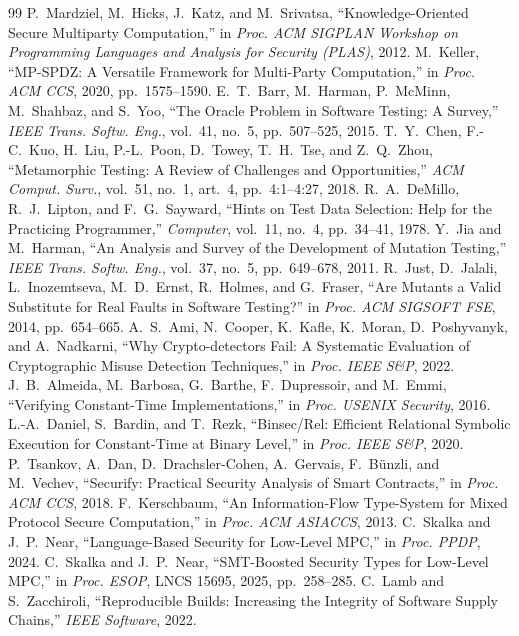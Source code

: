 \documentclass[conference]{IEEEtran}
\begin{document}
\begin{thebibliography}{99}\footnotesize
{} P.~Mardziel, M.~Hicks, J.~Katz, and M.~Srivatsa, ``Knowledge-Oriented Secure Multiparty Computation,'' in \emph{Proc. ACM SIGPLAN Workshop on Programming Languages and Analysis for Security (PLAS)}, 2012.
 M.~Keller, ``MP-SPDZ: A Versatile Framework for Multi-Party Computation,'' in \emph{Proc. ACM CCS}, 2020, pp.~1575--1590.
 E.~T.~Barr, M.~Harman, P.~McMinn, M.~Shahbaz, and S.~Yoo, ``The Oracle Problem in Software Testing: A Survey,'' \emph{IEEE Trans. Softw. Eng.}, vol.~41, no.~5, pp.~507--525, 2015.
 T.~Y.~Chen, F.-C.~Kuo, H.~Liu, P.-L.~Poon, D.~Towey, T.~H.~Tse, and Z.~Q.~Zhou, ``Metamorphic Testing: A Review of Challenges and Opportunities,'' \emph{ACM Comput. Surv.}, vol.~51, no.~1, art.~4, pp.~4:1--4:27, 2018.
 R.~A.~DeMillo, R.~J.~Lipton, and F.~G.~Sayward, ``Hints on Test Data Selection: Help for the Practicing Programmer,'' \emph{Computer}, vol.~11, no.~4, pp.~34--41, 1978.
 Y.~Jia and M.~Harman, ``An Analysis and Survey of the Development of Mutation Testing,'' \emph{IEEE Trans. Softw. Eng.}, vol.~37, no.~5, pp.~649--678, 2011.
 R.~Just, D.~Jalali, L.~Inozemtseva, M.~D.~Ernst, R.~Holmes, and G.~Fraser, ``Are Mutants a Valid Substitute for Real Faults in Software Testing?'' in \emph{Proc. ACM SIGSOFT FSE}, 2014, pp.~654--665.
 A.~S.~Ami, N.~Cooper, K.~Kafle, K.~Moran, D.~Poshyvanyk, and A.~Nadkarni, ``Why Crypto-detectors Fail: A Systematic Evaluation of Cryptographic Misuse Detection Techniques,'' in \emph{Proc. IEEE S\&P}, 2022.
 J.~B.~Almeida, M.~Barbosa, G.~Barthe, F.~Dupressoir, and M.~Emmi, ``Verifying Constant-Time Implementations,'' in \emph{Proc. USENIX Security}, 2016.
 L.-A.~Daniel, S.~Bardin, and T.~Rezk, ``Binsec/Rel: Efficient Relational Symbolic Execution for Constant-Time at Binary Level,'' in \emph{Proc. IEEE S\&P}, 2020.
 P.~Tsankov, A.~Dan, D.~Drachsler-Cohen, A.~Gervais, F.~B\"unzli, and M.~Vechev, ``Securify: Practical Security Analysis of Smart Contracts,'' in \emph{Proc. ACM CCS}, 2018.
 F.~Kerschbaum, ``An Information-Flow Type-System for Mixed Protocol Secure Computation,'' in \emph{Proc. ACM ASIACCS}, 2013.
 C.~Skalka and J.~P.~Near, ``Language-Based Security for Low-Level MPC,'' in \emph{Proc. PPDP}, 2024.
 C.~Skalka and J.~P.~Near, ``SMT-Boosted Security Types for Low-Level MPC,'' in \emph{Proc. ESOP}, LNCS 15695, 2025, pp.~258--285.
 C.~Lamb and S.~Zacchiroli, ``Reproducible Builds: Increasing the Integrity of Software Supply Chains,'' \emph{IEEE Software}, 2022.
\end{thebibliography}
\end{document}
